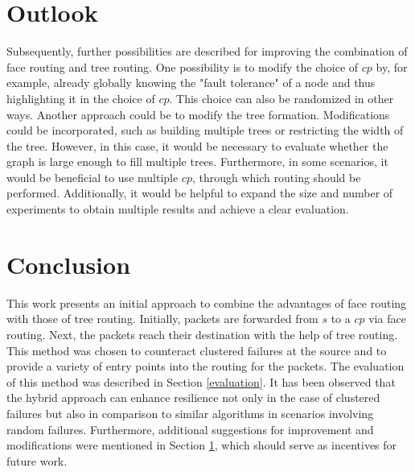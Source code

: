 \documentclass[a4paper,UKenglish,cleveref, autoref, thm-restate,dvipsnames]{lipics-v2021}
\begin{document}
\section{Outlook}
\label{outlook}
Subsequently, further possibilities are described for improving the combination of face routing and tree routing.
One possibility is to modify the choice of $cp$ by, for example, already globally knowing the "fault tolerance" of a node and thus highlighting it in the choice of $cp$. This choice can also be randomized in other ways.
Another approach could be to modify the tree formation. Modifications could be incorporated, such as building multiple trees or restricting the width of the tree. However, in this case, it would be necessary to evaluate whether the graph is large enough to fill multiple trees.
Furthermore, in some scenarios, it would be beneficial to use multiple $cp$, through which routing should be performed.
Additionally, it would be helpful to expand the size and number of experiments to obtain multiple results and achieve a clear evaluation.


\section{Conclusion}
This work presents an initial approach to combine the advantages of face routing with those of tree routing. Initially, packets are forwarded from $s$ to a $c p$ via face routing. 
Next, the packets reach their destination with the help of tree routing. 
This method was chosen to counteract clustered failures at the source and to provide a variety of entry points into the routing for the packets.
The evaluation of this method was described in Section \ref{evaluation}. 
It has been observed that the hybrid approach can enhance resilience not only in the case of clustered failures but also in comparison to similar algorithms in scenarios involving random failures.
Furthermore, additional suggestions for improvement and modifications were mentioned in Section \ref{outlook}, which should serve as incentives for future work.


\newpage


\appendix
\end{document}
